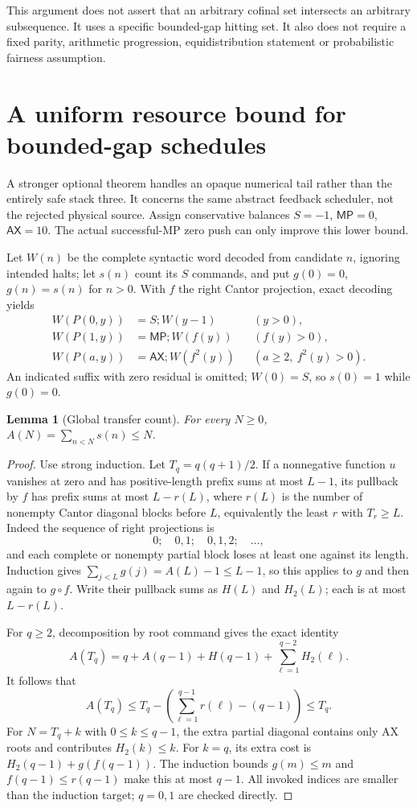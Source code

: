 \documentclass[11pt]{article}
\newcommand{\MP}{\mathsf{MP}}
\newcommand{\AX}{\mathsf{AX}}
\newtheorem{lemma}[theorem]{Lemma}
\begin{document}
This argument does not assert that an arbitrary cofinal set intersects an arbitrary subsequence. It uses a specific bounded-gap hitting set. It also does not require a fixed parity, arithmetic progression, equidistribution statement or probabilistic fairness assumption.

\section{A uniform resource bound for bounded-gap schedules}
A stronger optional theorem handles an opaque numerical tail rather than the entirely safe stack three. It concerns the same abstract feedback scheduler, not the rejected physical source. Assign conservative balances $S=-1$, $\MP=0$, $\AX=10$. The actual successful-MP zero push can only improve this lower bound.

Let $W(n)$ be the complete syntactic word decoded from candidate $n$, ignoring intended halts; let $s(n)$ count its $S$ commands, and put $g(0)=0$, $g(n)=s(n)$ for $n>0$. With $f$ the right Cantor projection, exact decoding yields
\begin{align*}
 W(P(0,y))&=S;W(y-1) &&(y>0),\\
 W(P(1,y))&=\MP;W(f(y)) &&(f(y)>0),\\
 W(P(a,y))&=\AX;W(f^2(y)) &&(a\ge2,\ f^2(y)>0).
\end{align*}
An indicated suffix with zero residual is omitted; $W(0)=S$, so $s(0)=1$ while $g(0)=0$.

\begin{lemma}[Global transfer count]
For every $N\ge0$, $A(N)=\sum_{n<N}s(n)\le N$.
\end{lemma}
\begin{proof}
Use strong induction. Let $T_q=q(q+1)/2$. If a nonnegative function $u$ vanishes at zero and has positive-length prefix sums at most $L-1$, its pullback by $f$ has prefix sums at most $L-r(L)$, where $r(L)$ is the number of nonempty Cantor diagonal blocks before $L$, equivalently the least $r$ with $T_r\ge L$. Indeed the sequence of right projections is
\[
 0;\quad 0,1;\quad 0,1,2;\quad\ldots,
\]
and each complete or nonempty partial block loses at least one against its length. Induction gives $\sum_{j<L}g(j)=A(L)-1\le L-1$, so this applies to $g$ and then again to $g\circ f$. Write their pullback sums as $H(L)$ and $H_2(L)$; each is at most $L-r(L)$.

For $q\ge2$, decomposition by root command gives the exact identity
\[
 A(T_q)=q+A(q-1)+H(q-1)+\sum_{\ell=1}^{q-2}H_2(\ell).
\]
It follows that
\[
 A(T_q)\le T_q-\left(\sum_{\ell=1}^{q-1}r(\ell)-(q-1)\right)\le T_q.
\]
For $N=T_q+k$ with $0\le k\le q-1$, the extra partial diagonal contains only AX roots and contributes $H_2(k)\le k$. For $k=q$, its extra cost is $H_2(q-1)+g(f(q-1))$. The induction bounds $g(m)\le m$ and $f(q-1)\le r(q-1)$ make this at most $q-1$. All invoked indices are smaller than the induction target; $q=0,1$ are checked directly.
\end{proof}
\end{document}
